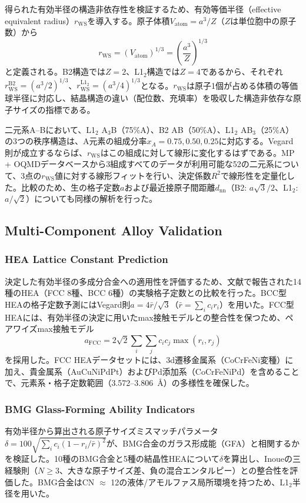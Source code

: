 \documentclass[a4paper,10pt,5p]{elsarticle}
\begin{document}
得られた有効半径の構造非依存性を検証するため、有効等価半径（effective equivalent radius）$r_\mathrm{WS}$を導入する。原子体積$V_\mathrm{atom} = a^3 / Z$（$Z$は単位胞中の原子数）から
\begin{equation}
    r_\mathrm{WS} = (V_\mathrm{atom})^{1/3} = \left(\frac{a^3}{Z}\right)^{1/3}
    \label{eq:r_ws}
\end{equation}
と定義される。B2構造では$Z = 2$、L1$_2$構造では$Z = 4$であるから、それぞれ$r_\mathrm{WS}^\mathrm{B2} = (a^3/2)^{1/3}$、$r_\mathrm{WS}^\mathrm{L1_2} = (a^3/4)^{1/3}$となる。$r_\mathrm{WS}$は原子1個が占める体積の等価球半径に対応し、結晶構造の違い（配位数、充填率）を吸収した構造非依存な原子サイズの指標である。

二元系A--Bにおいて、L1$_2$ A$_3$B（75\%A）、B2 AB（50\%A）、L1$_2$ AB$_3$（25\%A）の3つの秩序構造は、A元素の組成分率$x_A = 0.75, 0.50, 0.25$に対応する。Vegard則が成立するならば、$r_\mathrm{WS}$はこの組成に対して線形に変化するはずである。MP + OQMDデータベースから3組成すべてのデータが利用可能な52の二元系について、3点の$r_\mathrm{WS}$値に対する線形フィットを行い、決定係数$R^2$で線形性を定量化した。比較のため、生の格子定数$a$および最近接原子間距離$d_\mathrm{nn}$（B2: $a\sqrt{3}/2$、L1$_2$: $a/\sqrt{2}$）についても同様の解析を行った。

\subsection{Multi-Component Alloy Validation}

\subsubsection{HEA Lattice Constant Prediction}
決定した有効半径の多成分合金への適用性を評価するため、文献で報告された14種のHEA（FCC 8種、BCC 6種）の実験格子定数との比較を行った。BCC型HEAの格子定数予測にはVegard則$a = 4\bar{r}/\sqrt{3}$（$\bar{r} = \sum_i c_i r_i$）を用いた。FCC型HEAには、有効半径の決定に用いたmax接触モデルとの整合性を保つため、ペアワイズmax接触モデル
\begin{equation}
    a_\mathrm{FCC} = 2\sqrt{2}\sum_i \sum_j c_i c_j \max(r_i, r_j)
    \label{eq:fcc_pairwise}
\end{equation}
を採用した。FCC HEAデータセットには、3d遷移金属系（CoCrFeNi変種）に加え、貴金属系（AuCuNiPdPt）およびPd添加系（CoCrFeNiPd）を含めることで、元素系・格子定数範囲（3.572--3.806~\AA）の多様性を確保した。

\subsubsection{BMG Glass-Forming Ability Indicators}
有効半径から算出される原子サイズミスマッチパラメータ$\delta = 100\sqrt{\sum_i c_i (1 - r_i/\bar{r})^2}$が、BMG合金のガラス形成能（GFA）と相関するかを検証した。10種のBMG合金と5種の結晶性HEAについて$\delta$を算出し、Inoueの三経験則（$N \geq 3$、大きな原子サイズ差、負の混合エンタルピー）との整合性を評価した。BMG合金はCN $\approx$ 12の液体/アモルファス局所環境を持つため、L1$_2$半径を用いた。
\end{document}

